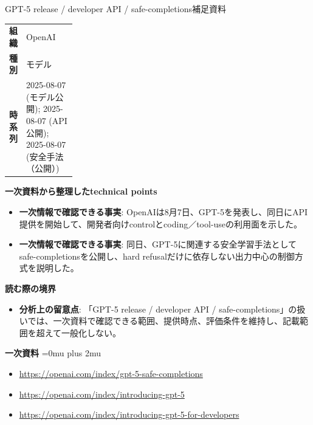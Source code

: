 \begin{technicalnote}{GPT-5 release / developer API / safe-completions}{補足資料}
\begingroup
\begin{tabularx}{\linewidth}{@{}>{\bfseries}p{0.22\linewidth}X@{}}
組織 & OpenAI \\
種別 & モデル \\
時系列 & 2025-08-07 (モデル公開); 2025-08-07 (API公開); 2025-08-07 (安全手法（公開）) \\
\end{tabularx}
\smallskip
{\bfseries 一次資料から整理したtechnical points}
\begin{itemize}[leftmargin=1.5em,itemsep=0.35em]
\item \textbf{一次情報で確認できる事実}: OpenAIは8月7日、GPT-5を発表し、同日にAPI提供を開始して、開発者向けcontrolとcoding／tool-useの利用面を示した。
\item \textbf{一次情報で確認できる事実}: 同日、GPT-5に関連する安全学習手法としてsafe-completionsを公開し、hard refusalだけに依存しない出力中心の制御方式を説明した。
\end{itemize}
\begin{minipage}{\linewidth}
{\bfseries 読む際の境界}
\begin{itemize}[leftmargin=1.5em,itemsep=0.35em]
\item \textbf{分析上の留意点}: 「GPT-5 release / developer API / safe-completions」の扱いでは、一次資料で確認できる範囲、提供時点、評価条件を維持し、記載範囲を超えて一般化しない。
\end{itemize}
\begin{samepage}
{\bfseries 一次資料}
\begingroup\sloppy
\Urlmuskip=0mu plus 2mu\relax
\begin{itemize}[leftmargin=1.5em,itemsep=0.25em]
\item {\scriptsize\url{https://openai.com/index/gpt-5-safe-completions}}
\item {\scriptsize\url{https://openai.com/index/introducing-gpt-5}}
\item {\scriptsize\url{https://openai.com/index/introducing-gpt-5-for-developers}}
\end{itemize}
\endgroup
\end{samepage}
\end{minipage}
\endgroup
\end{technicalnote}
\medskip


